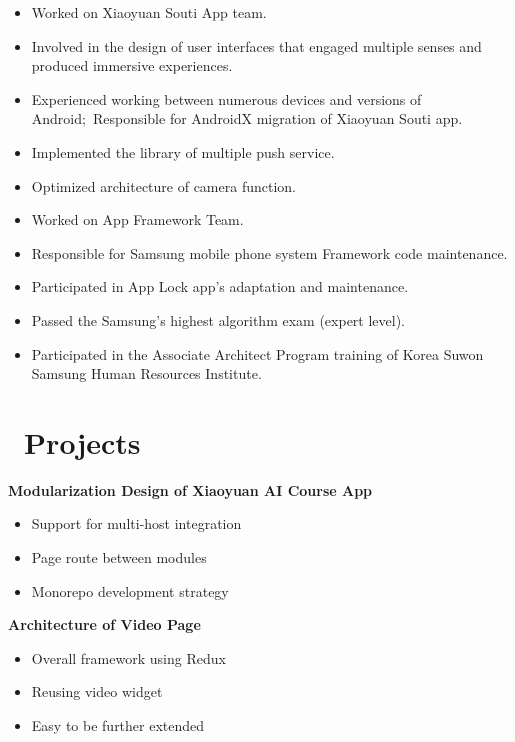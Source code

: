 \documentclass{resume}
\begin{document}
    \begin{itemize}
        \item Worked on Xiaoyuan Souti App team.
        \item Involved in the design of user interfaces that engaged multiple senses and produced immersive experiences.
        \item Experienced working between numerous devices and versions of Android;\ Responsible for AndroidX migration of Xiaoyuan Souti app.
        \item Implemented the library of multiple push service.
        \item Optimized architecture of camera function.
    \end{itemize}

    \begin{itemize}
        \item Worked on App Framework Team.
        \item Responsible for Samsung mobile phone system Framework code maintenance.
        \item Participated in App Lock app's adaptation and maintenance.
        \item Passed the Samsung's highest algorithm exam (expert level).
        \item Participated in the Associate Architect Program training of Korea Suwon Samsung Human Resources Institute.
    \end{itemize}


    \section{\faFileCodeO\ Projects}
    \textbf{Modularization Design of Xiaoyuan AI Course App}
    \begin{itemize}
        \item Support for multi-host integration
        \item Page route between modules
        \item Monorepo development strategy
    \end{itemize}

    \textbf{Architecture of Video Page}
    \begin{itemize}
        \item Overall framework using Redux
        \item Reusing video widget
        \item Easy to be further extended
    \end{itemize}
\end{document}
